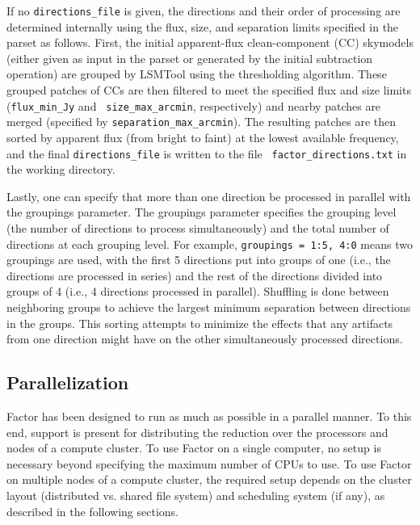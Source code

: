 \documentclass[structabstract]{article}
\begin{document}
If no {\tt directions\_file} is given, the directions and their order of
processing are determined internally using the flux, size, and separation limits
specified in the parset as follows. First, the initial apparent-flux
clean-component (CC) skymodels (either given as input in the parset or generated
by the initial subtraction operation) are grouped by LSMTool using the
thresholding algorithm. These grouped patches of CCs are then filtered to meet
the specified flux and size limits ({\tt flux\_min\_Jy} and {\tt
size\_max\_arcmin}, respectively) and nearby patches are merged (specified by
{\tt separation\_max\_arcmin}). The resulting patches are then sorted by
apparent flux (from bright to faint) at the lowest available frequency, and the
final {\tt directions\_file} is written to the file {\tt
factor\_directions.txt} in the working directory.

Lastly, one can specify that more than one direction be processed in parallel
with the groupings parameter. The groupings parameter specifies the grouping
level (the number of directions to process simultaneously) and the total number
of directions at each grouping level. For example, {\tt groupings = 1:5, 4:0}
means two groupings are used, with the first 5 directions put into groups of one
(i.e., the directions are processed in series) and the rest of the directions
divided into groups of 4 (i.e., 4 directions processed in parallel). Shuffling
is done between neighboring groups to achieve the largest minimum separation
between directions in the groups. This sorting attempts to minimize the effects
that any artifacts from one direction might have on the other simultaneously
processed directions.


\subsection{Parallelization}
\label{factor:parallel}

Factor has been designed to run as much as possible in a parallel manner. To
this end, support is present for distributing the reduction over the processors
and nodes of a compute cluster. To use Factor on a single computer, no setup is
necessary beyond specifying the maximum number of CPUs to use. To use Factor on
multiple nodes of a compute cluster, the required setup depends on the cluster
layout (distributed vs. shared file system) and scheduling system (if any), as
described in the following sections.
\end{document}
